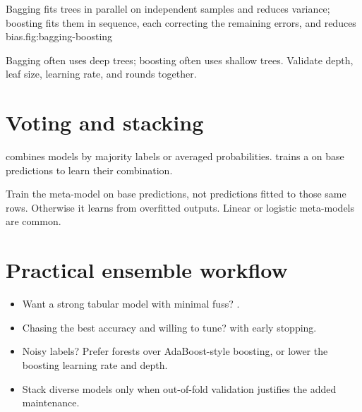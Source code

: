 \begin{utpfig}{Bagging fits trees in parallel on independent samples and reduces variance; boosting fits them in sequence, each correcting the remaining errors, and reduces bias.}{fig:bagging-boosting}
\end{utpfig}

\begin{keyidea}
Bagging often uses deep trees; boosting often uses shallow trees. Validate depth, leaf size, learning rate, and rounds together.
\end{keyidea}

\section{Voting and stacking}

 combines models by majority labels or averaged probabilities.  trains a  on base predictions to learn their combination.

Train the meta-model on  base predictions, not predictions fitted to those same rows. Otherwise it learns from overfitted outputs. Linear or logistic meta-models are common.

\section{Practical ensemble workflow}

\begin{itemize}
  \item Want a strong tabular model with minimal fuss? .
  \item Chasing the best accuracy and willing to tune?  with early stopping.
  \item Noisy labels? Prefer forests over AdaBoost-style boosting, or lower the boosting learning rate and depth.
  \item Stack diverse models only when out-of-fold validation justifies the added maintenance.
\end{itemize}

